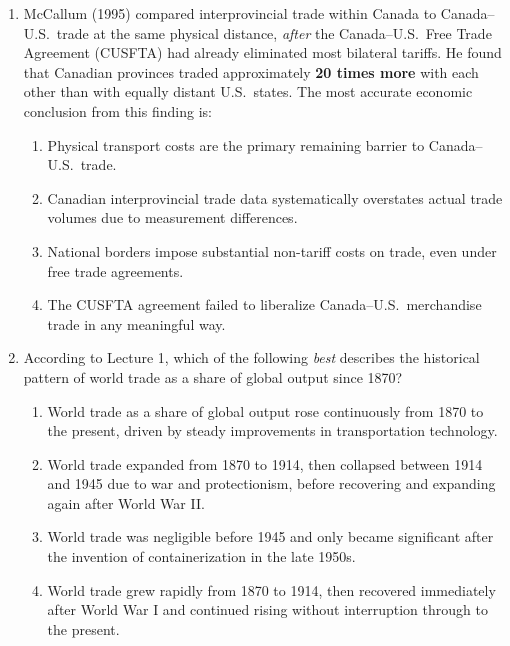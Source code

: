 \documentclass[11pt]{article}
\begin{document}
\begin{enumerate}
\bigskip\bigskip

\item McCallum (1995) compared interprovincial trade within Canada to
Canada--U.S.\ trade at the same physical distance, \emph{after} the Canada--U.S.\
Free Trade Agreement (CUSFTA) had already eliminated most bilateral tariffs. He
found that Canadian provinces traded approximately \textbf{20 times more} with
each other than with equally distant U.S.\ states. The most accurate economic
conclusion from this finding is:

\medskip
\begin{enumerate}[label=\textbf{\Alph*)},leftmargin=2em,itemsep=0.4em]
  \item Physical transport costs are the primary remaining barrier to Canada--U.S.\ trade.
  \item Canadian interprovincial trade data systematically overstates actual trade
        volumes due to measurement differences.
  \item National borders impose substantial non-tariff costs on trade, even under
        free trade agreements.
  \item The CUSFTA agreement failed to liberalize Canada--U.S.\ merchandise trade
        in any meaningful way.
\end{enumerate}

\medskip

\item According to Lecture 1, which of the following \emph{best} describes the
historical pattern of world trade as a share of global output since 1870?

\medskip
\begin{enumerate}[label=\textbf{\Alph*)},leftmargin=2em,itemsep=0.4em]
  \item World trade as a share of global output rose continuously from 1870 to
        the present, driven by steady improvements in transportation technology.
  \item World trade expanded from 1870 to 1914, then collapsed between 1914 and
        1945 due to war and protectionism, before recovering and expanding again
        after World War II.
  \item World trade was negligible before 1945 and only became significant after
        the invention of containerization in the late 1950s.
  \item World trade grew rapidly from 1870 to 1914, then recovered immediately
        after World War I and continued rising without interruption through to
        the present.
\end{enumerate}



\end{enumerate}
\end{document}
